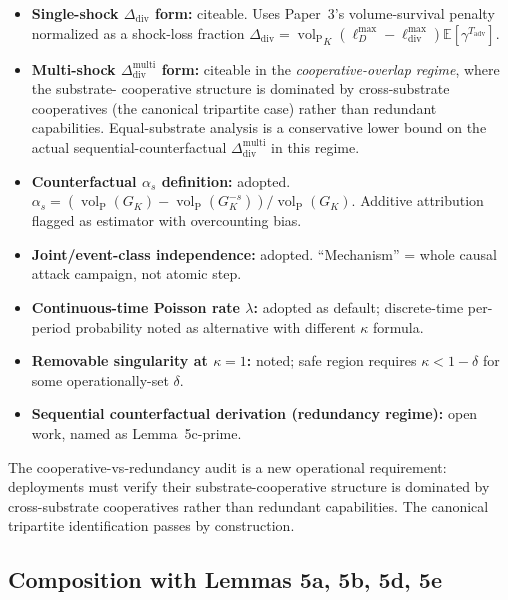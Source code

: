 \documentclass{article}
\DeclareMathOperator{\vol}{vol}
\newcommand{\volL}{{\vol_{\mathrm{P}}}}
\newcommand{\Ddiv}{\Delta_{\mathrm{div}}}
\newcommand{\lossDmax}{\ell_D^{\max}}
\newcommand{\lossdivmax}{\ell_{\mathrm{div}}^{\max}}
\begin{document}
\begin{itemize}
\item \textbf{Single-shock $\Ddiv$ form:} citeable.  Uses Paper~3's
  volume-survival penalty normalized as a shock-loss fraction
  $\Ddiv = \volL_K (\lossDmax - \lossdivmax) \mathbb{E}[\gamma^{T_{\mathrm{adv}}}]$.

\item \textbf{Multi-shock $\Ddiv^{\mathrm{multi}}$ form:} citeable
  in the \emph{cooperative-overlap regime}, where the substrate-
  cooperative structure is dominated by cross-substrate cooperatives
  (the canonical tripartite case) rather than redundant
  capabilities.  Equal-substrate analysis is a conservative lower
  bound on the actual sequential-counterfactual
  $\Ddiv^{\mathrm{multi}}$ in this regime.

\item \textbf{Counterfactual $\alpha_s$ definition:} adopted.
  $\alpha_s = (\volL(G_K) - \volL(G_K^{-s})) / \volL(G_K)$.
  Additive attribution flagged as estimator with overcounting bias.

\item \textbf{Joint/event-class independence:} adopted.
  ``Mechanism'' = whole causal attack campaign, not atomic step.

\item \textbf{Continuous-time Poisson rate $\lambda$:} adopted as
  default; discrete-time per-period probability noted as
  alternative with different $\kappa$ formula.

\item \textbf{Removable singularity at $\kappa = 1$:} noted; safe
  region requires $\kappa < 1 - \delta$ for some operationally-set
  $\delta$.

\item \textbf{Sequential counterfactual derivation (redundancy
  regime):} open work, named as Lemma~5c-prime.
\end{itemize}

The cooperative-vs-redundancy audit is a new operational requirement:
deployments must verify their substrate-cooperative structure is
dominated by cross-substrate cooperatives rather than redundant
capabilities.  The canonical tripartite identification passes by
construction.

\subsection{Composition with Lemmas 5a, 5b, 5d, 5e}
\end{document}
